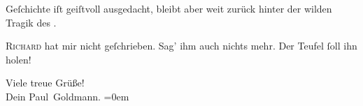                Geſchichte iſt geiſtvoll ausgedacht, bleibt aber weit zurück hinter der wilden Tragik
               des \label{K_L03059-13v}\label{K_L03059-13}.\pend
           
\pstart
           \textsc{Richard} hat mir nicht geſchrieben. Sag’ ihm auch nichts mehr. Der Teufel{ }ſoll ihn
               holen!\pend
           
\pstart
           Viele treue Grüße! {\\[\baselineskip]}Dein \spacefill\mbox{Paul Goldmann.}\pend
           \leftskip=0em{}\endnumbering{}  \newcommand{\dateiname}{L03059}\newcommand{\titel}{Paul Goldmann an Arthur Schnitzler, 18. 2. [1901]}\newcommand{\editorInnen}{Martin Anton Müller und Laura Untner}
